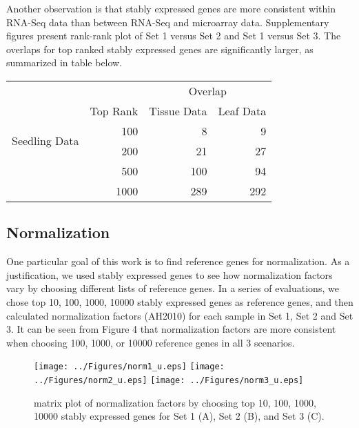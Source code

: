 \documentclass[11pt, a4paper]{article}
\begin{document}
Another observation is that stably expressed genes are more consistent within RNA-Seq data than between RNA-Seq and microarray data.  Supplementary figures present rank-rank plot of Set 1 versus Set 2 and Set 1 versus Set 3.  The overlaps for top ranked stably expressed genes are significantly larger, as summarized in table below.
\begin{center}
\begin{table}[h]
\begin{tabular}{lrrr}
     & &\multicolumn{2}{c}{Overlap} \\ \cmidrule(r){3-4}
\multirow{4}{*}{Seedling Data} &Top Rank & Tissue Data  & Leaf Data  \\  \hline
              	   &100  & 8 &9  \\
                  &200  & 21 &27 \\
                   &500  &100  &94 \\
                    &1000  &289  &292 \\ \hline
\end{tabular}
\end{table}

\end{center}

\subsection{Normalization}
One particular goal of this work is to find reference genes for normalization. As a justification, we used stably expressed genes to see how normalization factors vary by choosing different lists of reference genes.   In a series of evaluations, we chose top 10, 100, 1000, 10000 stably expressed genes as reference genes, and then calculated normalization factors \citep{anders2010differential}(AH2010) for each sample in Set 1, Set 2 and Set 3. It can be seen from Figure 4 that normalization factors are more consistent when choosing 100, 1000, or 10000 reference genes in all 3 scenarios. 

 \begin{figure}[h!]
\begin{center}
\texttt{[image: ../Figures/norm1\_u.eps]}
\texttt{[image: ../Figures/norm2\_u.eps]}
\texttt{[image: ../Figures/norm3\_u.eps]}

\caption{\label{fig:scaled_diss} matrix plot of normalization factors by choosing top 10, 100, 1000, 10000 stably expressed genes for Set 1 (A), Set 2 (B), and Set 3 (C). }
\end{center}
\end{figure}
\end{document}

